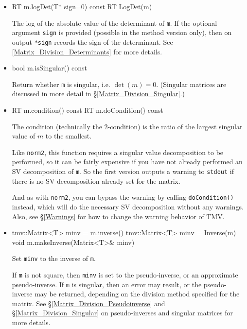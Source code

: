 \documentclass[twoside,letterpaper,11pt]{article}
\renewcommand{\tt}[1]{{\lstinline {#1}}}
\begin{document}
\begin{itemize}
\item
\begin{tmvcode}
RT m.logDet(T* sign=0) const
RT LogDet(m)
\end{tmvcode}
The log of the absolute value of the determinant of \tt{m}.  If the optional argument \tt{sign} is 
provided (possible in the method version only), then on output \tt{*sign} records the sign of the determinant.  See \ref{Matrix_Division_Determinants} 
for more details.

\item
\begin{tmvcode}
bool m.isSingular() const
\end{tmvcode}
Return whether \tt{m} is singular, i.e. $\det(m) = 0$.
(Singular matrices are discussed in more detail in \S\ref{Matrix_Division_Singular}.)

\item
\begin{tmvcode}
RT m.condition() const
RT m.doCondition() const
\end{tmvcode}
The condition (technically the 2-condition) is 
the ratio of the largest singular value of $m$ to the smallest.

Like \tt{norm2}, this function requires a singular value decomposition to be performed,
so it can be fairly expensive if you have not
already performed an SV decomposition of \tt{m}.
So the first version
outputs a warning to \tt{stdout} if there is no SV decomposition already set for the matrix.

And as with \tt{norm2}, you can bypass the warning by calling \tt{doCondition()} instead,
which will do the necessary SV decomposition without any warnings.  
Also, see \S\ref{Warnings} for how to change the warning behavior of TMV.

\item
\begin{tmvcode}
tmv::Matrix<T> minv = m.inverse()
tmv::Matrix<T> minv = Inverse(m)
void m.makeInverse(Matrix<T>& minv)
\end{tmvcode}
Set \tt{minv} to the inverse of \tt{m}.  

If \tt{m} is not square, then \tt{minv} is set to the pseudo-inverse, or an approximate
pseudo-inverse.  If \tt{m} is singular, then an error may result, or the pseudo-inverse
may be returned, depending on the division method specified for the matrix.  
See \S\ref{Matrix_Division_Pseudoinverse} and \S\ref{Matrix_Division_Singular} 
on pseudo-inverses and singular matrices for more details.


\end{itemize}
\end{document}
